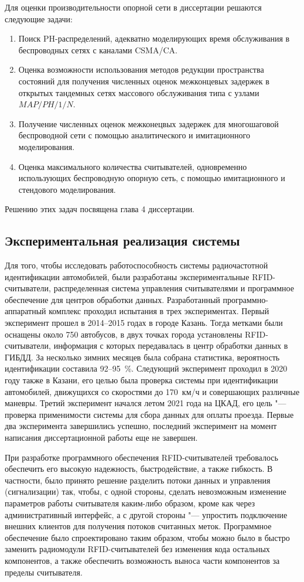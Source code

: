 Для оценки производительности опорной сети в диссертации решаются следующие задачи:

\begin{enumerate}
    \item Поиск PH-распределений, адекватно моделирующих время обслуживания в беспроводных сетях с каналами CSMA/CA.
    \item Оценка возможности использования методов редукции пространства состояний для получения численных оценок межконцевых задержек в открытых тандемных сетях массового обслуживания типа с узлами $MAP/PH/1/N$.
    \item Получение численных оценок межконецвых задержек для многошаговой беспроводной сети с помощью аналитического и имитационного моделирования.
    \item Оценка максимального количества считывателей, одновременно использующих беспроводную опорную сеть, с помощью имитационного и стендового моделирования.
\end{enumerate}

Решению этих задач посвящена глава 4 диссертации.


\subsection{Экспериментальная реализация системы}

Для того, чтобы исследовать работоспособность системы радиочастотной идентификации автомобилей, были разработаны экспериментальные RFID-считыватели, распределенная система управления считывателями и программное обеспечение для центров обработки данных. Разработанный программно-аппаратный комплекс проходил испытания в трех экспериментах. Первый эксперимент прошел в 2014--2015 годах в городе Казань. Тогда метками были оснащены около 750 автобусов, в двух точках города установлены RFID-считыватели, информация с которых передавалась в центр обработки данных в ГИБДД. За несколько зимних месяцев была собрана статистика, вероятность идентификации составила 92--95~\%. Следующий эксперимент проходил в 2020 году также в Казани, его целью была проверка системы при идентификации автомобилей, движущихся со скоростями до 170~км/ч и совершающих различные маневры. Третий эксперимент начался летом 2021 года на ЦКАД, его цель "--- проверка применимости системы для сбора данных для оплаты проезда. Первые два эксперимента завершились успешно, последний эксперимент на момент написания диссертационной работы еще не завершен.

При разработке программного обеспечения RFID-считывателей требовалось обеспечить его высокую надежность, быстродействие, а также гибкость. В частности, было принято решение разделить потоки данных и управления (сигнализации) так, чтобы, с одной стороны, сделать невозможным изменение параметров работы считывателя каким-либо образом, кроме как через административный интерфейс, а с другой стороны "--- упростить подключение внешних клиентов для получения потоков считанных меток. Программное обеспечение было спроектировано таким образом, чтобы можно было в быстро заменить радиомодули RFID-считывателей без изменения кода остальных компонентов, а также обеспечить возможность выноса части компонентов за пределы считывателя.

